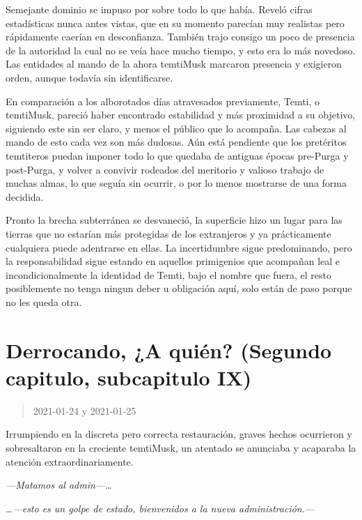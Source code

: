 \documentclass[
  spanish,
]{book}
\begin{document}
Semejante dominio se impuso por sobre todo lo que había. Reveló cifras estadísticas nunca antes vistas, que en su momento parecían muy realistas pero rápidamente caerían en desconfianza. También trajo consigo un poco de presencia de la autoridad la cual no se veía hace mucho tiempo, y esto era lo más novedoso. Las entidades al mando de la ahora temtiMusk marcaron presencia y exigieron orden, aunque todavía sin identificarse.

En comparación a los alborotados días atravesados previamente, Temti, o temtiMusk, pareció haber encontrado estabilidad y más proximidad a su objetivo, siguiendo este sin ser claro, y menos el público que lo acompaña. Las cabezas al mando de esto cada vez son más dudosas. Aún está pendiente que los pretéritos temtiteros puedan imponer todo lo que quedaba de antiguas épocas pre-Purga y post-Purga, y volver a convivir rodeados del meritorio y valioso trabajo de muchas almas, lo que seguía sin ocurrir, o por lo menos mostrarse de una forma decidida.

Pronto la brecha subterránea se desvaneció, la superficie hizo un lugar para las tierras que no estarían más protegidas de los extranjeros y ya prácticamente cualquiera puede adentrarse en ellas.
La incertidumbre sigue predominando, pero la responsabilidad sigue estando en aquellos primigenios que acompañan leal e incondicionalmente la identidad de Temti, bajo el nombre que fuera, el resto posiblemente no tenga ningun deber u obligación aquí, solo están de paso porque no les queda otra.

\hypertarget{derrocando-a-quiuxe9n-segundo-capitulo-subcapitulo-ix}{%
\section{Derrocando, ¿A quién? (Segundo capitulo, subcapitulo IX)}\label{derrocando-a-quiuxe9n-segundo-capitulo-subcapitulo-ix}}

\begin{quote}
2021-01-24 y 2021-01-25
\end{quote}

Irrumpiendo en la discreta pero correcta restauración, graves hechos ocurrieron y sobresaltaron en la creciente temtiMusk, un atentado se anunciaba y acaparaba la atención extraordinariamente.

\emph{---Matamos al admin---}\ldots{}

\ldots{}\emph{---esto es un golpe de estado, bienvenidos a la nueva administración.---}
\end{document}
